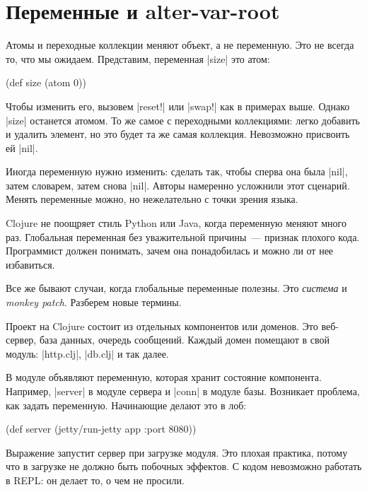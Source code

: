 \section{Переменные и alter-var-root}

\label{alter-var-root}

Атомы и переходные коллекции меняют объект, а не переменную. Это не всегда то,
что мы ожидаем. Представим, переменная \spverb|size| это атом:

\begin{english}
  \begin{clojure}
(def size (atom 0))
  \end{clojure}
\end{english}

Чтобы изменить его, вызовем \spverb|reset!| или \spverb|swap!| как в примерах
выше. Однако \spverb|size| останется атомом. То же самое с переходными
коллекциями: легко добавить и удалить элемент, но это будет та же самая
коллекция. Невозможно присвоить ей \spverb|nil|.

Иногда переменную нужно изменить: сделать так, чтобы сперва она была
\spverb|nil|, затем словарем, затем снова \spverb|nil|. Авторы намеренно
усложнили этот сценарий. Менять переменные можно, но нежелательно с точки зрения
языка.

Clojure не поощряет стиль Python или Java, когда переменную меняют много
раз. Глобальная переменная без уважительной причины~--- признак плохого кода.
Программист должен понимать, зачем она понадобилась и можно ли от нее
избавиться.

Все же бывают случаи, когда глобальные переменные полезны. Это \emph{система} и
\emph{monkey patch}. Разберем новые термины.

Проект на Clojure состоит из отдельных компонентов или доменов. Это веб-сервер,
база данных, очередь сообщений. Каждый домен помещают в свой модуль:
\spverb|http.clj|, \spverb|db.clj| и так далее.

В модуле объявляют переменную, которая хранит состояние компонента. Например,
\spverb|server| в модуле сервера и \spverb|conn| в модуле базы. Возникает
проблема, как задать переменную. Начинающие делают это в лоб:

\begin{english}
  \begin{clojure}
(def server (jetty/run-jetty app {:port 8080}))
  \end{clojure}
\end{english}

Выражение запустит сервер при загрузке модуля. Это плохая практика, потому что в
загрузке не должно быть побочных эффектов. С кодом невозможно работать в REPL: он
делает то, о чем не просили.

